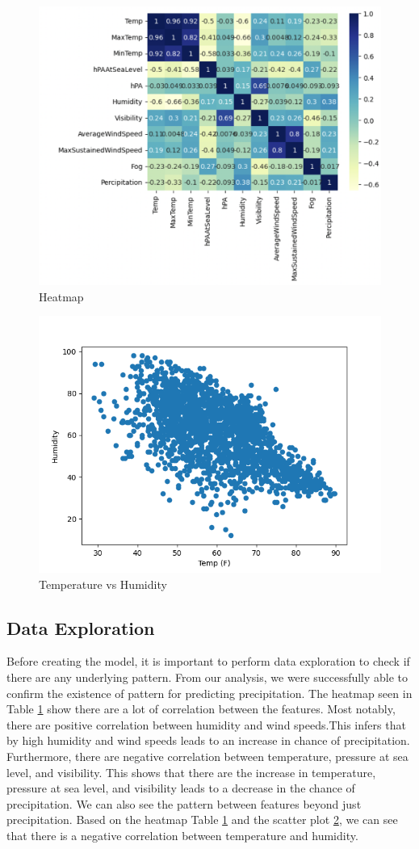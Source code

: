 \documentclass[conference]{IEEEtran}
\begin{document}
\begin{figure}
\begin{center}
\includegraphics[width=.4\textwidth]{Heatmap.png}
\caption{Heatmap}
\label{Heatmap}
\end{center}
\end{figure}

\begin{figure}
\begin{center}
\includegraphics[width=.4\textwidth]{TempvsHumidity.png}
\caption{Temperature vs Humidity}
\label{TH}
\end{center}
\end{figure}

\subsection{Data Exploration}
Before creating the model, it is important to perform data exploration to check if there are any underlying pattern. From our analysis, we were successfully able to confirm the existence of pattern for predicting precipitation. The heatmap seen in Table \ref{Heatmap} show there are a lot of correlation between the features. Most notably, there are positive correlation between humidity and wind speeds.This infers that by high humidity and wind speeds leads to an increase in chance of precipitation. Furthermore, there are negative correlation between temperature, pressure at sea level, and visibility. This shows that there are the increase in temperature, pressure at sea level, and visibility leads to a decrease in the chance of precipitation. We can also see the pattern between features beyond just precipitation. Based on the heatmap Table \ref{Heatmap} and the scatter plot \ref{TH}, we can see that there is a negative correlation between temperature and humidity.
\end{document}
